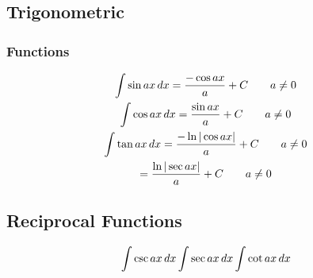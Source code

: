 \documentclass[12pt]{article}
\begin{document}
		\subsection{Trigonometric}
			\subsubsection{Functions}
				\begin{gather}
					\int \sin ax\,dx = \frac{-\cos ax}{a} +
					C \qquad a \neq 0 \\
					\int \cos ax\,dx = \frac{\sin ax}{a} +
					C \qquad a \neq 0 \\
					\int \tan ax\,dx = \frac{-\ln |\cos
					ax|}{a} + C \qquad a \neq 0 \\
					= \frac{\ln |\sec ax|}{a} + C \qquad a
					\neq 0
				\end{gather}
			\subsection{Reciprocal Functions}
				\begin{gather}
					\int \csc ax\,dx
					\int \sec ax\,dx
					\int \cot ax\,dx
				\end{gather}
\end{document}
